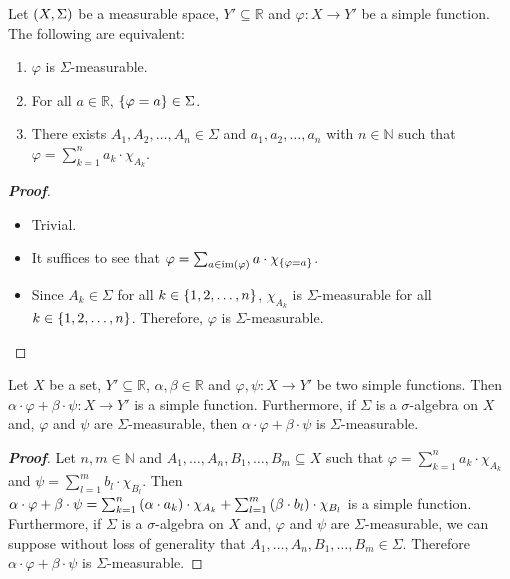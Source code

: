 \begin{proposition}
  Let $\left(X,\Sigma\right)$ be a measurable space, $Y'\subseteq\mathbb{R}$ and $\varphi:X\rightarrow Y'$ be a simple function. The following are equivalent:

  \begin{enumerate}
    \item $\varphi$ is $\Sigma$-measurable.
    \item For all $a\in\mathbb{R}$, $\left\{\varphi=a\right\}\in\Sigma$.
    \item There exists $A_1,A_2,\dots,A_n\in\Sigma$ and $a_1,a_2,\dots,a_n$ with $n\in\mathbb{N}$ such that $\varphi=\sum_{k=1}^{n}{a_k\cdot\chi_{A_k}}$.
  \end{enumerate}
  \begin{proof}[\rm\textbf{Proof}]
    \hfill
    \begin{itemize}
      \item[\boxed{1\Rightarrow2}] Trivial.
      \item[\boxed{2\Rightarrow3}] It suffices to see that $\varphi=\sum_{a\in\operatorname{im}\left(\varphi\right)}{a\cdot\chi_{\left\{\varphi=a\right\}}}$.
      \item[\boxed{3\Rightarrow1}] Since $A_k\in\Sigma$ for all $k\in\left\{1,2,\dots,n\right\}$, $\chi_{A_k}$ is $\Sigma$-measurable for all $k\in\left\{1,2,\dots,n\right\}$. Therefore, $\varphi$ is $\Sigma$-measurable.
    \end{itemize}
  \end{proof}
\end{proposition}

\begin{proposition}
  Let $X$ be a set, $Y'\subseteq\mathbb{R}$, $\alpha,\beta\in\mathbb{R}$ and $\varphi,\psi:X\rightarrow Y'$ be two simple functions. Then $\alpha\cdot\varphi+\beta\cdot\psi:X\rightarrow Y'$ is a simple function. Furthermore, if $\Sigma$ is a $\sigma$-algebra on $X$ and, $\varphi$ and $\psi$ are $\Sigma$-measurable, then $\alpha\cdot\varphi+\beta\cdot\psi$ is $\Sigma$-measurable.
  \begin{proof}[\rm\textbf{Proof}]
    Let $n,m\in\mathbb{N}$ and $A_1,\dots,A_n,B_1,\dots,B_m\subseteq X$ such that $\varphi=\sum_{k=1}^{n}{a_k\cdot\chi_{A_k}}$ and $\psi=\sum_{l=1}^{m}{b_l\cdot\chi_{B_l}}$. Then $\alpha\cdot\varphi+\beta\cdot\psi=\sum_{k=1}^{n}{\left(\alpha\cdot a_k\right)\cdot\chi_{A_k}}+\sum_{l=1}^{m}{\left(\beta\cdot b_l\right)\cdot\chi_{B_l}}$ is a simple function. Furthermore, if $\Sigma$ is a $\sigma$-algebra on $X$ and, $\varphi$ and $\psi$ are $\Sigma$-measurable, we can suppose without loss of generality that $A_1,\dots,A_n,B_1,\dots,B_m\in\Sigma$. Therefore $\alpha\cdot\varphi+\beta\cdot\psi$ is $\Sigma$-measurable.
  \end{proof}
\end{proposition}

